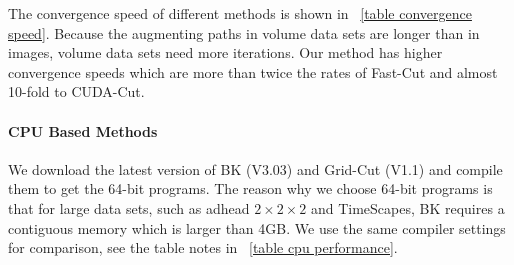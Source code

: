The convergence speed of different methods is shown in \tablename \ \ref{table convergence speed}.
Because the augmenting paths in volume data sets are longer than in images, volume data sets need more iterations.
Our method has higher convergence speeds which are more than twice the rates of Fast-Cut and almost 10-fold to CUDA-Cut.

\paragraph*{\textbf{CPU Based Methods}}

We download the latest version of BK (V3.03) and Grid-Cut (V1.1) and compile them to get the 64-bit programs.
The reason why we choose 64-bit programs is that for large data sets, such as adhead $2 \times 2 \times 2$ and TimeScapes, BK requires a contiguous memory which is larger than 4GB.
We use the same compiler settings for comparison, see the table notes in \tablename \ \ref{table cpu performance}.

